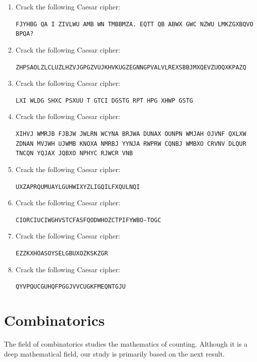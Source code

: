 \documentclass{book}
\theoremstyle{plain}
\theoremstyle{definition}
\newif\ifprintsolutions
\newcommand{\solution}[1]{\ifprintsolutions \begin{sloppypar}{\it #1}\end{sloppypar} \fi} %
\newcommand{\ciphertext}[1]{\texttt{#1}} %
\newcommand{\display}[1]{\begin{sloppypar}\setlength{\parindent}{0mm}#1\end{sloppypar}} %
\begin{document}
\begin{enumerate}
\item Crack the following Caesar cipher:
\display{\ciphertext{FJYHBG QA I ZIVLWU AMB WN TMBBMZA. EQTT QB ABWX GWC NZWU LMKZGXBQVO BPQA?}} \solution{Shift a $\mapsto$ I: XBQZTY is a random set of letters. Will it stop you from decrypting this?}
\item Crack the following Caesar cipher:
\display{\ciphertext{ZHPSAOLZLCLUZLHZVJGPGZVUJKHVKUGZEGNNGPVALVLREXSBBJMXQEVZUOQXKPAZQ}} \solution{Shift a $\mapsto$ H: sail the seven seas \\ Shift a $\mapsto$ C: the next shift is excellent \\ Shift a $\mapsto$ X: do you have empathy \\ Shift a $\mapsto$ M: nicely done}
\item Crack the following Caesar cipher:
\display{\ciphertext{LXI WLDG SHXC PSXUU T GTCI DGSTG RPT HPG XHWP GSTG}} \solution{Shift a $\mapsto$ P: wit hwor dsin adiff e rent order cae sar isha rder}
\item Crack the following Caesar cipher:
\display{\ciphertext{XIHVJ WMRJB FJBJW JWLRN WCYNA BRJWA DUNAX OUNPN WMJAH OJVNF QXLXW ZDNAN MVJWH UJWMB KNOXA NMRBJ YYNJA RWPRW CQNBJ WMBXO CRVNV DLQUR TNCQN YQJAX JQBXO NPHYC RJWCR VNB}} \solution{Shift: a $\mapsto$ J: Ozymandias was an ancient persian ruler of legendary fame who conquered many lands before disappearing in the sands of time much like the pharaohs of Egyptian times}
\item Crack the following Caesar cipher:
\display{\ciphertext{UXZAPRQUMUAYLGUHWIXYZLIGQILFXQULNQI}} \solution{Shift: a $\mapsto$ U: ADFGVX was a German code from World War Two}
\item Crack the following Caesar cipher:
\display{\ciphertext{CIORCIUCIWGHVSTCFASFQODWHOZCTPIFYWBO-TOGC}} \solution{Shift: a $\mapsto$ O: Ouadougou is the former capital of Burkina-Faso}
\item Crack the following Caesar cipher:
\display{\ciphertext{EZZKXHOASOYSELGBUXOZKSKZGR}} \solution{Shift a $\mapsto$ G: Ytterbium is my favorite metal}
\item Crack the following Caesar cipher:
\display{\ciphertext{QYVPQUCGUHQFPGGJVVCUGKFMEQNTGJU}} \solution{Shift a $\mapsto$ C: owt nosaes fo dne eht ta seid kcolrehs}
\end{enumerate}

\chapter{Combinatorics}
The field of combinatorics studies the mathematics of counting. Although it is a deep mathematical field, our study is primarily based on the next result.
\end{document}
